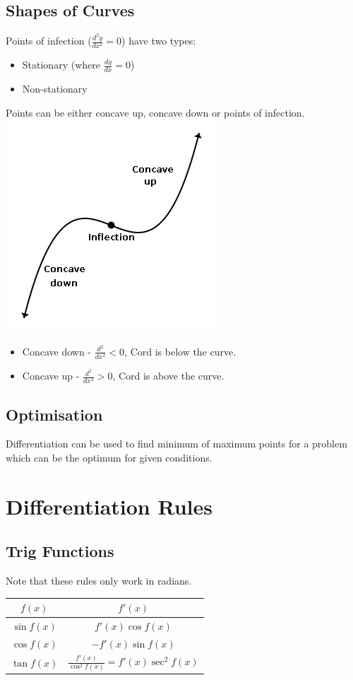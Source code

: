 \documentclass[a4paper,12pt]{article}
\begin{document}
\subsection*{Shapes of Curves}
Points of infection ($\frac{d^2y}{dx^2} = 0$) have two types:
\begin{itemize}
	\item Stationary (where $\frac{dy}{dx} = 0$)
	\item Non-stationary
\end{itemize}
Points can be either concave up, concave down or points of infection. \\
\includegraphics[scale=0.5]{Graph2} \\
\begin{itemize}
	\item Concave down - $\frac{d^2}{dx^2} < 0$, Cord is below the curve. 
	\item Concave up - $\frac{d^2}{dx^2} > 0$, Cord is above the curve.   
\end{itemize}
\subsection*{Optimisation}
Differentiation can be used to find minimum of maximum points for a problem which can be the optimum for given conditions. 
\section*{Differentiation Rules}
\subsection*{Trig Functions}
Note that these rules only work in radians. \\
\begin{tabular}{ c c }
\hline
	 $f(x)$ & $f'(x)$  \\ 
\hline
	$\sin f(x)$ & $f'(x) \cos f(x)$ \\
	$\cos f(x)$ & $-f'(x) \sin f(x)$ \\
	$\tan f(x)$ & $\frac{f'(x)}{\cos^2 f(x)} = f'(x)\sec^2 f(x)$ \\
\hline
\end{tabular}
\end{document}
